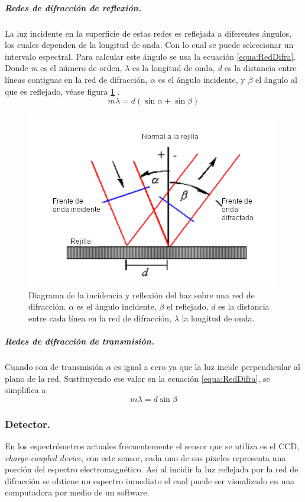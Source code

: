 \subparagraph{Redes de difracción de reflexión.}
La luz incidente en la superficie de estas redes es reflejada a diferentes ángulos, los cuales dependen de la longitud de onda. Con lo cual se puede seleccionar un intervalo espectral. Para calcular este ángulo se usa la ecuación \ref{equa:RedDifra}. Donde \textit{m} es el número de orden, $\lambda$ es la longitud de onda, \textit{d} es la distancia entre líneas contiguas en la red de difracción, $\alpha$ es el ángulo incidente, y $\beta$ el ángulo al que es reflejado, véase figura \ref{fig:reflexion} \cite{Excel2000}.
\begin{equation}
	m\lambda = d(\sin\alpha + \sin\beta)
	\label{equa:RedDifra}
\end{equation}
\begin{figure}[h]
	\centering
	\includegraphics[width=0.6\linewidth]{Imagenes/reflexion}
	\caption{Diagrama de la incidencia y reflexión del haz sobre una red de difracción. $\alpha$ es el ángulo incidente, $\beta$ el reflejado, $d$  es la distancia entre cada línea en la red de difracción, $\lambda$ la longitud de onda. \cite{Excel2000}}
	\label{fig:reflexion}
\end{figure}


\subparagraph{Redes de difracción de transmisión.}
Cuando son de transmisión $\alpha$ es igual a cero ya que la luz incide perpendicular al plano de la red. Sustituyendo ese valor en la ecuación \ref{equa:RedDifra}, se simplifica a
\begin{equation}
m\lambda = d\sin\beta
\label{equa:difra}
\end{equation}
\subsubsection{Detector.}
En los espectrómetros actuales frecuentemente el sensor que se utiliza es el CCD, \textit{charge-coupled device}, con este sensor, cada uno de sus pixeles representa una porción del espectro electromagnético. Así al incidir la luz reflejada por la red de difracción se obtiene un espectro inmediato el cual puede ser visualizado en una computadora por medio de un software.

